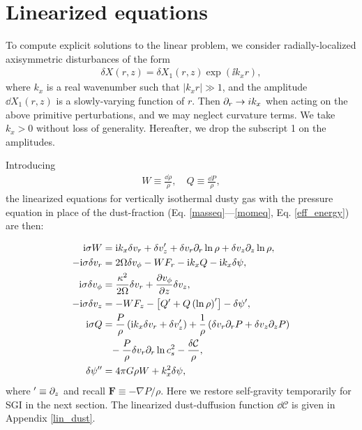 \section{Linearized equations}\label{linear_problem}
To compute explicit solutions to the linear problem, 
we consider radially-localized axisymmetric disturbances of the form  
\begin{align}
  \delta X (r, z) = \delta X_1(r,z)\exp{(\ii k_x r)},
\end{align} 
where $k_x$ is a real wavenumber such that $|k_xr|\gg 1$, and the 
amplitude $\dd X_1(r,z)$ is 
a slowly-varying function of $r$. Then 
$\partial_r\to i k_x$ when acting on the above primitive perturbations, and we may
neglect curvature terms. We take  
$k_x>0$ without loss of generality. Hereafter, we drop the subscript 1
on the amplitudes. 

Introducing 
\begin{align}
  W \equiv \frac{\dd\rho}{\rho}, \quad Q \equiv \frac{\dd P}{\rho},
\end{align}
the linearized equations for 
vertically isothermal dusty gas with the pressure
equation in place of the dust-fraction
(Eq. \ref{masseq}---\ref{momeq}, Eq. \ref{eff_energy}) are then:    

\begin{align}
  \ii\sigma W &= \ii k_x \dd v_r + \dd v_z^\prime +
  \dd v_r \p_r\ln{\rho} + \dd v_z\p_z\ln{\rho},\label{lin_mass}\\
  -\ii\sigma\dd v_r  &= 2\Omega\dd v_\phi 
- W F_r - \ii k_x Q - \ii k_x\dd\psi,\label{lin_xmom}\\
  \ii\sigma\dd v_\phi &= \frac{\kappa^2}{2\Omega}\dd v_r + \frac{\p
    v_\phi}{\p z}\dd v_z, \label{lin_ymom}\\
  -\ii\sigma\dd v_z &= - W F_z - \left[Q^\prime + Q
    \left(\ln{\rho}\right)^\prime\right] - \dd\psi^\prime  %
,\label{lin_zmom}\\
  \ii\sigma Q &= \frac{P}{\rho}\left(\ii k_x \dd v_r + \dd
               v_z^\prime\right) + \frac{1}{\rho}\left(\dd v_r\p_rP + \dd v_z \p_zP\right)\notag\\
                &\phantom{=}-\frac{P}{\rho} \dd v_r\p_r
               \ln{c_s^2} %
               - \frac{\dd\mathcal{C}}{\rho},\label{lin_energy}\\
\dd\psi^{\prime\prime}  &= 4\pi G \rho W + k_x^2\dd\psi, \label{lin_sg}
\end{align}  
where $^\prime \equiv \partial_z$ and recall $\bm{F} \equiv -\nabla
P/\rho$. Here we restore self-gravity temporarily for SGI in the next
section. The linearized dust-duffusion function 
$\dd\mathcal{C}$ is given in  Appendix \ref{lin_dust}. 

